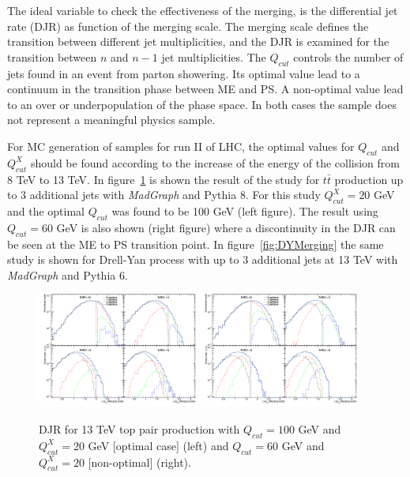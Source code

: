 The ideal variable to check the effectiveness of the merging, is the differential jet rate (DJR) as function of the merging scale. The merging scale defines the transition between different jet multiplicities, and the DJR is examined for the transition between $n$ and $n-1$ jet multiplicities. The $Q_{cut}$ controls the number of jets found in an event from parton showering. Its optimal value lead to a continuum in the transition phase between ME and PS. A non-optimal value lead to an over or underpopulation of the phase space. In both cases the sample does not represent a meaningful physics sample.

For MC generation of samples for run II of LHC, the optimal values for $Q_{cut}$ and $Q^{X}_{cut}$ should be found according to the increase of the energy of the collision from 8 TeV to 13 TeV. In figure~\ref{fig:TTJetsMerging} is shown the result of the study for $t\bar{t}$ production up to 3 additional jets with \textit{MadGraph} and Pythia 8. For this study $Q^{X}_{cut}=20$ GeV and the optimal $Q_{cut}$ was found to be 100 GeV (left figure). The result using $Q_{cut}=60$ GeV is also shown (right figure) where a discontinuity in the DJR can be seen at the ME to PS transition point. In figure~\ref{fig:DYMerging} the same study is shown for Drell-Yan process with up to 3 additional jets at 13 TeV with \textit{MadGraph} and Pythia 6. 

\begin{figure}[!Hhtbp]
  \begin{center}
    \includegraphics[width=0.47\textwidth]{figs/DJR_q100_xq20_TTJets13TeV.png}
    \includegraphics[width=0.47\textwidth]{figs/DJR_q50_xq20_TTJets13TeV.png}
    \caption{DJR for 13 TeV top pair production with $Q_{cut}=100$ GeV and $Q^{X}_{cut}=20$ GeV [optimal case] (left) and $Q_{cut}=60$ GeV and $Q^{X}_{cut}=20$ [non-optimal] (right).}
    \label{fig:TTJetsMerging}
  \end{center}
\end{figure}

